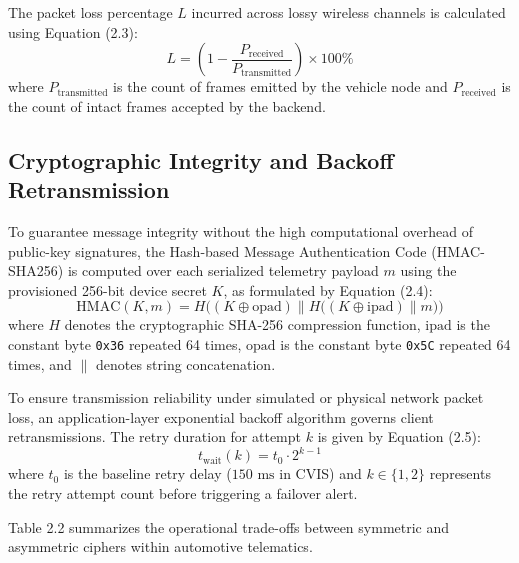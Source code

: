 \documentclass[12pt,a4paper]{report}
\begin{document}
The packet loss percentage $L$ incurred across lossy wireless channels is calculated using Equation (2.3):
\begin{equation}
L = \left( 1 - \frac{P_{\text{received}}}{P_{\text{transmitted}}} \right) \times 100\%
\end{equation}
where $P_{\text{transmitted}}$ is the count of frames emitted by the vehicle node and $P_{\text{received}}$ is the count of intact frames accepted by the backend.

\subsection{Cryptographic Integrity and Backoff Retransmission}
To guarantee message integrity without the high computational overhead of public-key signatures, the Hash-based Message Authentication Code (HMAC-SHA256) is computed over each serialized telemetry payload $m$ using the provisioned 256-bit device secret $K$, as formulated by Equation (2.4):
\begin{equation}
\text{HMAC}(K, m) = H\Big( (K \oplus \text{opad}) \parallel H\big( (K \oplus \text{ipad}) \parallel m \big) \Big)
\end{equation}
where $H$ denotes the cryptographic SHA-256 compression function, $\text{ipad}$ is the constant byte \texttt{0x36} repeated 64 times, $\text{opad}$ is the constant byte \texttt{0x5C} repeated 64 times, and $\parallel$ denotes string concatenation.

To ensure transmission reliability under simulated or physical network packet loss, an application-layer exponential backoff algorithm governs client retransmissions. The retry duration for attempt $k$ is given by Equation (2.5):
\begin{equation}
t_{\text{wait}}(k) = t_0 \cdot 2^{k-1}
\end{equation}
where $t_0$ is the baseline retry delay ($150\text{ ms}$ in CVIS) and $k \in \{1, 2\}$ represents the retry attempt count before triggering a failover alert.

Table 2.2 summarizes the operational trade-offs between symmetric and asymmetric ciphers within automotive telematics.
\end{document}
